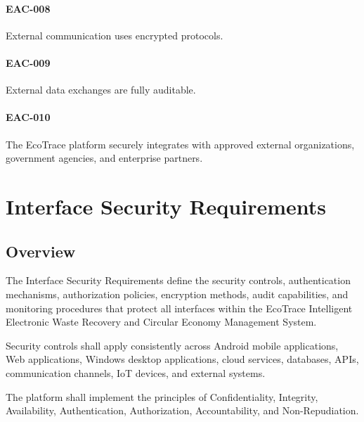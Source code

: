 \paragraph{EAC-008}

External communication uses encrypted protocols.

\paragraph{EAC-009}

External data exchanges are fully auditable.

\paragraph{EAC-010}

The EcoTrace platform securely integrates with approved external
organizations, government agencies, and enterprise partners.








\section{Interface Security Requirements}


\subsection{Overview}

The Interface Security Requirements define the security controls,
authentication mechanisms, authorization policies, encryption methods,
audit capabilities, and monitoring procedures that protect all
interfaces within the EcoTrace Intelligent Electronic Waste Recovery
and Circular Economy Management System.

Security controls shall apply consistently across Android mobile
applications, Web applications, Windows desktop applications, cloud
services, databases, APIs, communication channels, IoT devices, and
external systems.

The platform shall implement the principles of Confidentiality,
Integrity, Availability, Authentication, Authorization, Accountability,
and Non-Repudiation.

